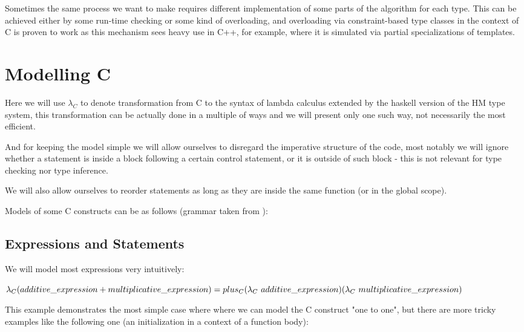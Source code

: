 Sometimes the same process we want to make requires different implementation of some parts of the algorithm for each type. This can be achieved either by some run-time checking or some kind of overloading, and overloading via constraint-based type classes in the context of C is proven to work as this mechanism sees heavy use in C++, for example,
where it is simulated via partial specializations of templates.


\section{Modelling C}

Here we will use $\lambda_C$ to denote transformation from C to the syntax of lambda calculus extended by the haskell version of the HM type system, this transformation can be actually done in a multiple of ways and we will present only one such way, not necessarily the most efficient.

And for keeping the model simple we will allow ourselves to disregard the imperative structure of the code, most notably we will ignore whether a statement is inside a block following a certain control statement, or it is outside of such block - this is not relevant for type checking nor type inference.

We will also allow ourselves to reorder statements as long as they are inside the same function (or in the global scope).

Models of some C constructs can be as follows (grammar taken from ): %

\subsection{Expressions and Statements}

We will model most expressions very intuitively:

$\lambda_C(additive\_expression + multiplicative\_expression) = \\ plus_C (\lambda_C\ additive\_expression) (\lambda_C\ multiplicative\_expression)$

This example demonstrates the most simple case where where we can model the C construct "one to one", but there are more tricky examples like the following one (an initialization in a context of a function body):


